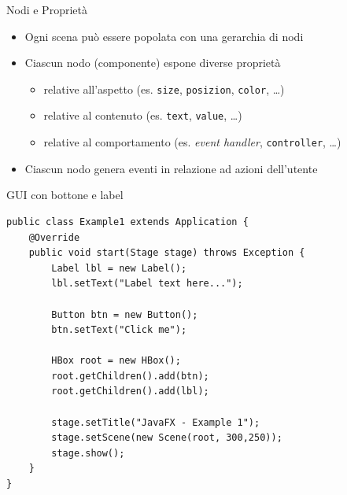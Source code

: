 \documentclass[xcolor=dvipsnames,presentation]{beamer}
\begin{document}
\begin{frame}{Nodi e Proprietà}
\begin{itemize}\itemsep10pt
\item Ogni scena può essere popolata con una gerarchia di nodi
\item Ciascun nodo (componente) espone diverse proprietà
\begin{itemize}
\item relative all'aspetto (es. \texttt{size}, \texttt{posizion}, \texttt{color}, \dots)
\item relative al contenuto (es. \texttt{text}, \texttt{value}, \dots)
\item relative al comportamento (es. \emph{event handler}, \texttt{controller}, \dots)
\end{itemize}
\item Ciascun nodo genera eventi in relazione ad azioni dell'utente
\end{itemize}
\end{frame}

\begin{frame}[fragile]{GUI con bottone e label}
\begin{lstlisting}
public class Example1 extends Application {
	@Override
	public void start(Stage stage) throws Exception {
		Label lbl = new Label();
		lbl.setText("Label text here...");

		Button btn = new Button();
		btn.setText("Click me");

		HBox root = new HBox();
		root.getChildren().add(btn);
		root.getChildren().add(lbl);

		stage.setTitle("JavaFX - Example 1");
		stage.setScene(new Scene(root, 300,250));
		stage.show();
	}
}
\end{lstlisting}
\end{frame}
\end{document}
